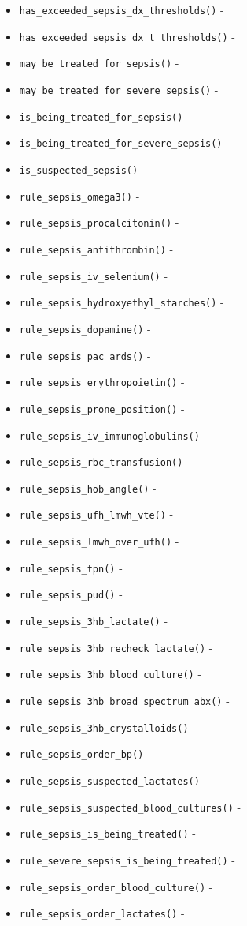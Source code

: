 \documentclass[
]{book}
\providecommand{\tightlist}{%
  \setlength{\itemsep}{0pt}\setlength{\parskip}{0pt}}
\begin{document}
\begin{itemize}
\tightlist
\item
  \texttt{has\_exceeded\_sepsis\_dx\_thresholds()} -
\item
  \texttt{has\_exceeded\_sepsis\_dx\_t\_thresholds()} -
\item
  \texttt{may\_be\_treated\_for\_sepsis()} -
\item
  \texttt{may\_be\_treated\_for\_severe\_sepsis()} -
\item
  \texttt{is\_being\_treated\_for\_sepsis()} -
\item
  \texttt{is\_being\_treated\_for\_severe\_sepsis()} -
\item
  \texttt{is\_suspected\_sepsis()} -
\item
  \texttt{rule\_sepsis\_omega3()} -
\item
  \texttt{rule\_sepsis\_procalcitonin()} -
\item
  \texttt{rule\_sepsis\_antithrombin()} -
\item
  \texttt{rule\_sepsis\_iv\_selenium()} -
\item
  \texttt{rule\_sepsis\_hydroxyethyl\_starches()} -
\item
  \texttt{rule\_sepsis\_dopamine()} -
\item
  \texttt{rule\_sepsis\_pac\_ards()} -
\item
  \texttt{rule\_sepsis\_erythropoietin()} -
\item
  \texttt{rule\_sepsis\_prone\_position()} -
\item
  \texttt{rule\_sepsis\_iv\_immunoglobulins()} -
\item
  \texttt{rule\_sepsis\_rbc\_transfusion()} -
\item
  \texttt{rule\_sepsis\_hob\_angle()} -
\item
  \texttt{rule\_sepsis\_ufh\_lmwh\_vte()} -
\item
  \texttt{rule\_sepsis\_lmwh\_over\_ufh()} -
\item
  \texttt{rule\_sepsis\_tpn()} -
\item
  \texttt{rule\_sepsis\_pud()} -
\item
  \texttt{rule\_sepsis\_3hb\_lactate()} -
\item
  \texttt{rule\_sepsis\_3hb\_recheck\_lactate()} -
\item
  \texttt{rule\_sepsis\_3hb\_blood\_culture()} -
\item
  \texttt{rule\_sepsis\_3hb\_broad\_spectrum\_abx()} -
\item
  \texttt{rule\_sepsis\_3hb\_crystalloids()} -
\item
  \texttt{rule\_sepsis\_order\_bp()} -
\item
  \texttt{rule\_sepsis\_suspected\_lactates()} -
\item
  \texttt{rule\_sepsis\_suspected\_blood\_cultures()} -
\item
  \texttt{rule\_sepsis\_is\_being\_treated()} -
\item
  \texttt{rule\_severe\_sepsis\_is\_being\_treated()} -
\item
  \texttt{rule\_sepsis\_order\_blood\_culture()} -
\item
  \texttt{rule\_sepsis\_order\_lactates()} -
\end{itemize}
\end{document}
